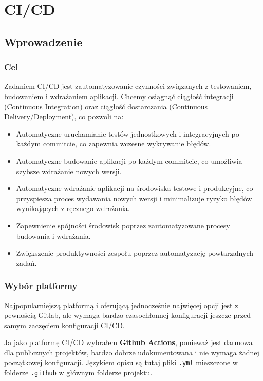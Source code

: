 \documentclass{article}
\begin{document}
\section{CI/CD} \label{sectionCICD}

\subsection{Wprowadzenie}

\subsubsection{Cel}

Zadaniem CI/CD jest zautomatyzowanie czynności związanych z testowaniem, budowaniem i wdrażaniem aplikacji. Chcemy osiągnąć ciągłość integracji (Continuous Integration) oraz ciągłość dostarczania (Continuous Delivery/Deployment), co pozwoli na:

\begin{itemize}
\item Automatyczne uruchamianie testów jednostkowych i integracyjnych po każdym commitcie, co zapewnia wczesne wykrywanie błędów.
\item Automatyczne budowanie aplikacji po każdym commitcie, co umożliwia szybsze wdrażanie nowych wersji.
\item Automatyczne wdrażanie aplikacji na środowiska testowe i produkcyjne, co przyspiesza proces wydawania nowych wersji i minimalizuje ryzyko błędów wynikających z ręcznego wdrażania.
\item Zapewnienie spójności środowisk poprzez zautomatyzowane procesy budowania i wdrażania.
\item Zwiększenie produktywności zespołu poprzez automatyzację powtarzalnych zadań.
\end{itemize}

\subsubsection{Wybór platformy}

Najpopularniejszą platformą i oferującą jednocześnie najwięcej opcji jest z pewnością Gitlab, ale wymaga bardzo czasochłonnej konfiguracji jeszcze przed samym zaczęciem konfiguracji CI/CD.

Ja jako platformę CI/CD wybrałem \textbf{Github Actions}, ponieważ jest darmowa dla publicznych projektów, bardzo dobrze udokumentowana i nie wymaga żadnej początkowej konfiguracji. Językiem opisu są tutaj pliki \lstinline|.yml| mieszczone w folderze \lstinline|.github| w głównym folderze projektu.
\end{document}

